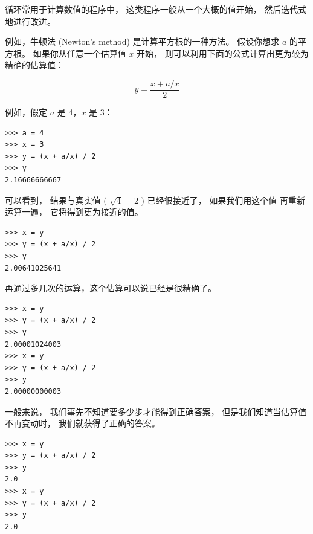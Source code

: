 循环常用于计算数值的程序中， 这类程序一般从一个大概的值开始， 然后迭代式地进行改进。


例如，牛顿法 (Newton's method) 是计算平方根的一种方法。 假设你想求 $a$ 的平方根。 如果你从任意一个估算值 $x$ 开始， 则可以利用下面的公式计算出更为较为精确的估算值：

\[ y = \frac{x + a/x}{2} \]

%

例如，假定 $a$ 是 4，$x$ 是 3：

\begin{lstlisting}
>>> a = 4
>>> x = 3
>>> y = (x + a/x) / 2
>>> y
2.16666666667
\end{lstlisting}

%

可以看到， 结果与真实值 ( $\sqrt{4} = 2$ ) 已经很接近了， 如果我们用这个值
再重新运算一遍， 它将得到更为接近的值。


\begin{lstlisting}
>>> x = y
>>> y = (x + a/x) / 2
>>> y
2.00641025641
\end{lstlisting}

%

再通过多几次的运算，这个估算可以说已经是很精确了。

\begin{lstlisting}
>>> x = y
>>> y = (x + a/x) / 2
>>> y
2.00001024003
>>> x = y
>>> y = (x + a/x) / 2
>>> y
2.00000000003
\end{lstlisting}

%

一般来说， 我们事先不知道要多少步才能得到正确答案， 但是我们知道当估算值不再变动时， 我们就获得了正确的答案。

\begin{lstlisting}
>>> x = y
>>> y = (x + a/x) / 2
>>> y
2.0
>>> x = y
>>> y = (x + a/x) / 2
>>> y
2.0
\end{lstlisting}

